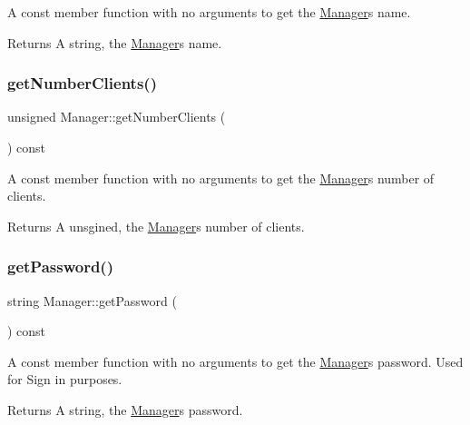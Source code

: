 A const member function with no arguments to get the \hyperlink{class_manager}{Manager}\textquotesingle{}s name. \begin{DoxyReturn}{Returns}
A string, the \hyperlink{class_manager}{Manager}\textquotesingle{}s name. 
\end{DoxyReturn}
\hypertarget{class_manager_a7cbdf1fa72bc7a42be54d69ca121bc24}{}\label{class_manager_a7cbdf1fa72bc7a42be54d69ca121bc24} 
\subsubsection{\texorpdfstring{get\+Number\+Clients()}{getNumberClients()}}
{\footnotesize\ttfamily unsigned Manager\+::get\+Number\+Clients (\begin{DoxyParamCaption}{ }\end{DoxyParamCaption}) const}

A const member function with no arguments to get the \hyperlink{class_manager}{Manager}\textquotesingle{}s number of clients. \begin{DoxyReturn}{Returns}
A unsgined, the \hyperlink{class_manager}{Manager}\textquotesingle{}s number of clients. 
\end{DoxyReturn}
\hypertarget{class_manager_a0e51eb07257a109072b7d0c9740915f3}{}\label{class_manager_a0e51eb07257a109072b7d0c9740915f3} 
\subsubsection{\texorpdfstring{get\+Password()}{getPassword()}}
{\footnotesize\ttfamily string Manager\+::get\+Password (\begin{DoxyParamCaption}{ }\end{DoxyParamCaption}) const}

A const member function with no arguments to get the \hyperlink{class_manager}{Manager}\textquotesingle{}s password. Used for Sign in purposes. \begin{DoxyReturn}{Returns}
A string, the \hyperlink{class_manager}{Manager}\textquotesingle{}s password. 
\end{DoxyReturn}
\hypertarget{class_manager_ab9bd1c1c60122f3db0fca93fc4313833}{}\label{class_manager_ab9bd1c1c60122f3db0fca93fc4313833} 

